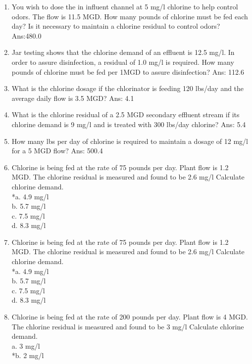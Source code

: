 \begin{enumerate}
\\
\item You wish to dose the in influent channel at 5 mg/l chlorine to help control odors. The flow is 11.5 MGD.  How many pounds of chlorine must be fed each day? Is it necessary to maintain a chlorine residual to control odors?   Ans:480.0\\
\item Jar testing shows that the chlorine demand of an effluent is 12.5 mg/l. In order to assure disinfection, a residual of 1.0 mg/l is required. How many pounds of chlorine must be fed per 1MGD to assure disinfection?  Ans:  112.6
\\
\item What is the chlorine dosage if the chlorinator is feeding 120 lbs/day and the average daily flow is 3.5 MGD?  Ans:  4.1 \\
\item What is the chlorine residual of a 2.5 MGD secondary effluent stream if its chlorine demand is 9 mg/l and is treated with 300 lbs/day chlorine?  Ans:  5.4
\\
\item How many lbs per day of chlorine is required to maintain a dosage of 12 mg/l for a 5 MGD flow?  Ans:  500.4
\\
\item Chlorine is being fed at the rate of 75 pounds per day. Plant flow is 1.2 MGD. The chlorine residual is measured and found to be 2.6 mg/l Calculate chlorine demand. \\
*a. 4.9 mg/l \\
b. 5.7 mg/l \\
c. 7.5 mg/l \\
d. 8.3 mg/l \\
\item Chlorine is being fed at the rate of 75 pounds per day. Plant flow is 1.2 MGD. The chlorine residual is measured and found to be 2.6 mg/l Calculate chlorine demand. \\
*a. 4.9 mg/l \\
b. 5.7 mg/l \\
c. 7.5 mg/l \\
d. 8.3 mg/l \\
\item Chlorine is being fed at the rate of 200 pounds per day. Plant flow is 4 MGD. The chlorine residual is measured and found to be 3 mg/l Calculate chlorine demand. \\
a. 3 mg/l \\
*b. 2 mg/l \\

\end{enumerate}
